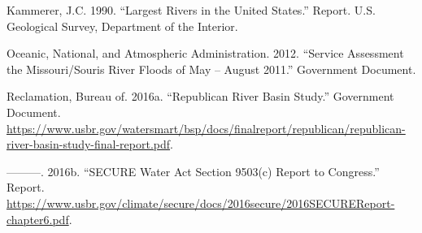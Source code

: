 \documentclass[12pt,]{article}
\begin{document}
\leavevmode\hypertarget{ref-kammerer1990}{}%
Kammerer, J.C. 1990. ``Largest Rivers in the United States.'' Report.
U.S. Geological Survey, Department of the Interior.

\leavevmode\hypertarget{ref-noaa2012}{}%
Oceanic, National, and Atmospheric Administration. 2012. ``Service
Assessment the Missouri/Souris River Floods of May -- August 2011.''
Government Document.

\leavevmode\hypertarget{ref-bor2016-2}{}%
Reclamation, Bureau of. 2016a. ``Republican River Basin Study.''
Government Document.
\url{https://www.usbr.gov/watersmart/bsp/docs/finalreport/republican/republican-river-basin-study-final-report.pdf}.

\leavevmode\hypertarget{ref-bor2016-1}{}%
---------. 2016b. ``SECURE Water Act Section 9503(c) Report to
Congress.'' Report.
\url{https://www.usbr.gov/climate/secure/docs/2016secure/2016SECUREReport-chapter6.pdf}.
\end{document}
